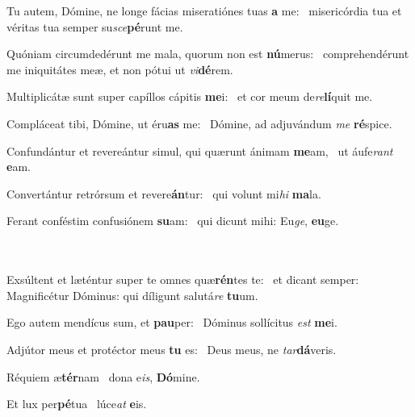 \item Tu autem, Dómine, ne longe fácias miseratiónes tuas \textbf{a} me:~\psstar{} misericórdia tua et véritas tua semper su\textit{sce}\textbf{pé}runt me.

\item Quóniam circumdedérunt me mala, quorum non est \textbf{nú}merus:~\psstar{} comprehendérunt me iniquitátes meæ, et non pótui ut \textit{vi}\textbf{dé}rem.

\item Multiplicátæ sunt super capíllos cápitis \textbf{me}i:~\psstar{} et cor meum de\textit{re}\textbf{lí}quit me.

\item Compláceat tibi, Dómine, ut éru\textbf{as} me:~\psstar{} Dómine, ad adjuvándum \textit{me} \textbf{ré}spice.

\item Confundántur et revereántur simul, qui quærunt ánimam \textbf{me}am,~\psstar{} ut áufe\textit{rant} \textbf{e}am.

\item Convertántur retrórsum et revere\textbf{án}tur:~\psstar{} qui volunt mi\textit{hi} \textbf{ma}la.

\item Ferant conféstim confusiónem \textbf{su}am:~\psstar{} qui dicunt mihi: Eu\textit{ge}, \textbf{eu}ge.\\~\\~

\item Exsúltent et læténtur super te omnes quæ\textbf{rén}tes te:~\psstar{} et dicant semper: Magnificétur Dóminus: qui díligunt salutá\textit{re} \textbf{tu}um.

\item Ego autem mendícus sum, et \textbf{pau}per:~\psstar{} Dóminus sollícitus \textit{est} \textbf{me}i.

\item Adjútor meus et protéctor meus \textbf{tu} es:~\psstar{} Deus meus, ne \textit{tar}\textbf{dá}veris.

\item Réquiem æ\textbf{tér}nam~\psstar{} dona e\textit{is}, \textbf{Dó}mine.

\item Et lux per\textbf{pé}tua~\psstar{} lúce\textit{at} \textbf{e}is.